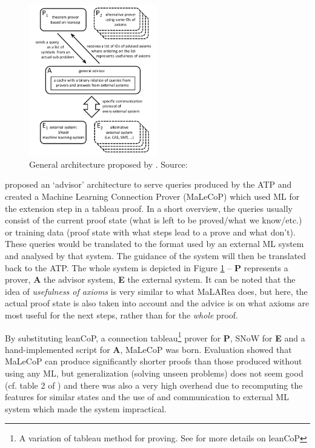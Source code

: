 \documentclass{article}
\begin{document}
\begin{figure}[t]
    \centering
    \includegraphics[width=0.5\textwidth]{malecop_arch.png}
    \caption{General architecture proposed by \cite{malecop}. Source: \cite{malecop}}
    \label{fig:malecop}
\end{figure}

\cite{malecop} proposed an `advisor' architecture to serve queries produced by
the ATP and created a Machine Learning Connection Prover (MaLeCoP) which used
ML for the extension step in a tableau proof. In a short overview, the queries
usually consist of the current proof state (what is left to be proved/what we
know/etc.) or training data (proof state with what steps lead to a prove and
what don't). These queries would be translated to the format used by an
external ML system and analysed by that system.  The guidance of the system
will then be translated back to the ATP. The whole system is depicted in Figure
\ref{fig:malecop} -- \textbf{P} represents a prover, \textbf{A} the advisor
system, \textbf{E} the external system. It can be noted that the idea of
\emph{usefulness of axioms} is very similar to what MaLARea does, but here, the
actual proof state is also taken into account and the advice is on what axioms
are most useful for the next steps, rather than for the \emph{whole} proof.

By substituting leanCoP, a connection tableau\footnote{A variation of
tableau method for proving. See \cite{leancop} for more details on leanCoP}
prover for \textbf{P}, SNoW \citep{SNoW} for \textbf{E} and a hand-implemented
script for \textbf{A}, MaLeCoP \citep{malecop} was born. Evaluation showed that
MaLeCoP can produce significantly shorter proofs than those produced without
using any ML, but generalization (solving unseen problems) does not seem good
(cf. table 2 of \cite{malecop}) and there was also a very high overhead due to
recomputing the features for similar states and the use of and communication to
external ML system which made the system impractical.
\end{document}
